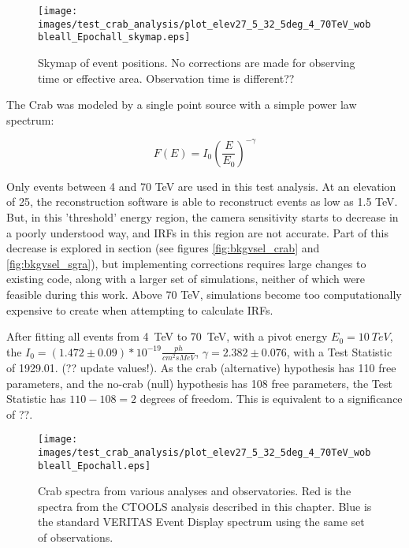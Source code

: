     \begin{figure}[h]
      \centering
      \texttt{[image: images/test\_crab\_analysis/plot\_elev27\_5\_32\_5deg\_4\_70TeV\_wobbleall\_Epochall\_skymap.eps]}
      \caption[Crab Counts Skymap]
      {
        Skymap of event positions.
        No corrections are made for observing time or effective area.
        Observation time is different??
      }
      \label{fig:crab_skymap}
    \end{figure}
    
    The Crab was modeled by a single point source with a simple power law spectrum:

    \begin{equation} \label{eqn:powerlaw}
    F\left( E \right) = I_{0} \left( \frac{E}{E_{0}} \right)^{-\gamma}
    \end{equation}

    Only events between 4 and 70 TeV are used in this test analysis.
    At an elevation of 25\degree, the reconstruction software is able to reconstruct events as low as 1.5 TeV.
    But, in this 'threshold' energy region, the camera sensitivity starts to decrease in a poorly understood way, and IRFs in this region are not accurate.
    Part of this decrease is explored in section (see figures \ref{fig:bkgvsel_crab} and \ref{fig:bkgvsel_sgra}), but implementing corrections requires large changes to existing code, along with a larger set of simulations, neither of which were feasible during this work.
    Above 70 TeV, simulations become too computationally expensive to create when attempting to calculate IRFs.
    
    After fitting all events from \SI{4}{TeV} to \SI{70}{TeV}, with a pivot energy $ E_{0}= \SI{10}{TeV} $, the $ I_{0} = \left(1.472\pm0.09\right)*10^{-19} \frac{ph}{cm^{2} s MeV} $, $ \gamma = 2.382 \pm 0.076 $, with a Test Statistic of 1929.01. (?? update values!).
    As the crab (alternative) hypothesis has 110 free parameters, and the no-crab (null) hypothesis has 108 free parameters, the Test Statistic has $ 110 - 108 = 2 $ degrees of freedom.
    This is equivalent to a significance of ??.
    
    
    \begin{figure}[h]
      \centering
      \texttt{[image: images/test\_crab\_analysis/plot\_elev27\_5\_32\_5deg\_4\_70TeV\_wobbleall\_Epochall.eps]}
      \caption[Crab Test Spectrum]
      {
        Crab spectra from various analyses and observatories.
        Red is the spectra from the CTOOLS analysis described in this chapter.
        Blue is the standard VERITAS Event Display spectrum using the same set of observations.
      }
      \label{fig:crab_test_spectra}
    \end{figure}
    
